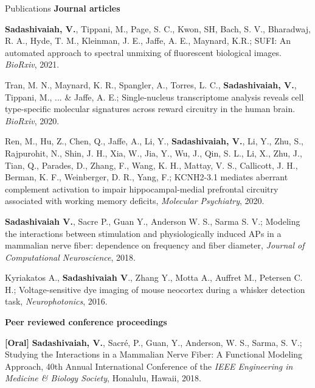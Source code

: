 \documentclass{resume}
\begin{document}
\vspace{1em} 
\begin{rSection}{Publications}
\textbf{\Large Journal articles}
\begin{publications}

\item \textbf{Sadashivaiah, V.}, Tippani, M., Page, S. C., Kwon, SH, Bach, S. V., Bharadwaj, R. A., Hyde, T. M., Kleinman, J. E., Jaffe, A. E., Maynard, K.R.; SUFI: An automated approach to spectral unmixing of fluorescent biological images. \textit{BioRxiv}, 2021.

\item Tran, M. N., Maynard, K. R., Spangler, A., Torres, L. C., \textbf{Sadashivaiah, V.}, Tippani, M., ... \& Jaffe, A. E.; Single-nucleus transcriptome analysis reveals cell type-specific molecular signatures across reward circuitry in the human brain. \textit{BioRxiv}, 2020.

\item Ren, M., Hu, Z., Chen, Q., Jaffe, A., Li, Y., \textbf{Sadashivaiah, V.}, Li, Y., Zhu, S., Rajpurohit, N., Shin, J. H., Xia, W., Jia, Y., Wu, J., Qin, S. L., Li, X., Zhu, J., Tian, Q., Parades, D., Zhang, F., Wang, K. H., Mattay, V. S., Callicott, J. H., Berman, K. F., Weinberger, D. R., Yang, F.; KCNH2-3.1 mediates aberrant complement activation to impair hippocampal-medial prefrontal circuitry associated with working memory deficits, \textit{Molecular Psychiatry}, 2020.

\item \textbf{Sadashivaiah V.}, Sacre P., Guan Y., Anderson W. S., Sarma S. V.; Modeling the interactions between stimulation and physiologically induced APs in a mammalian nerve fiber: dependence on frequency and fiber diameter, \textit{Journal of Computational Neuroscience}, 2018.

\item Kyriakatos A., \textbf{Sadashivaiah V}., Zhang Y., Motta A., Auffret M., Petersen C. H.; Voltage-sensitive dye imaging of mouse neocortex during a whisker detection task, \textit{Neurophotonics}, 2016.

\end{publications}

\textbf{\Large Peer reviewed conference proceedings}
\begin{conferences}

\item \textbf{[Oral]} \textbf{Sadashivaiah, V.}, Sacré, P., Guan, Y., Anderson, W. S., Sarma, S. V.; Studying the Interactions in a Mammalian Nerve Fiber: A Functional Modeling Approach, 40th Annual International Conference of the \textit{IEEE Engineering in Medicine \& Biology Society}, Honalulu, Hawaii, 2018.


\end{conferences}
\end{rSection}
\end{document}

